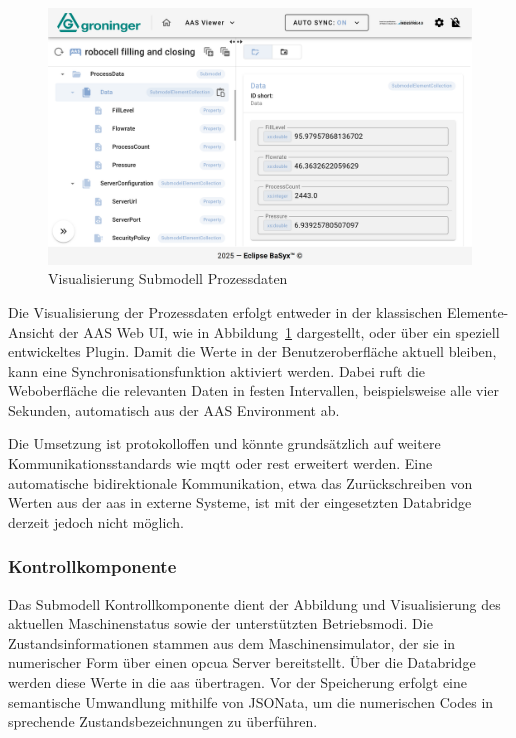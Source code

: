 \vspace{0.2em}
\begin{figure}[htbp]
    \centering
    \includegraphics[width=1\textwidth]{Bilder/ErgebnisseAASWebUI/ProcessData.png}
    \caption{Visualisierung Submodell Prozessdaten}
    \label{fig:Processdata}
\end{figure}
\vspace{-0.7em}
Die Visualisierung der Prozessdaten erfolgt entweder in der klassischen Elemente-Ansicht der AAS Web UI, wie in Abbildung~\ref{fig:Processdata} dargestellt, oder über ein speziell entwickeltes Plugin.
Damit die Werte in der Benutzeroberfläche aktuell bleiben, kann eine Synchronisationsfunktion aktiviert werden.
Dabei ruft die Weboberfläche die relevanten Daten in festen Intervallen, beispielsweise alle vier Sekunden, automatisch aus der AAS Environment ab.

Die Umsetzung ist protokolloffen und könnte grundsätzlich auf weitere Kommunikationsstandards wie \acs{mqtt} oder \acs{rest} erweitert werden.
Eine automatische bidirektionale Kommunikation, etwa das Zurückschreiben von Werten aus der \acs{aas} in externe Systeme, ist mit der eingesetzten Databridge derzeit jedoch nicht möglich.

\subsubsection*{Kontrollkomponente}
\vspace{-0.5em}
Das Submodell Kontrollkomponente dient der Abbildung und Visualisierung des aktuellen Maschinenstatus sowie der unterstützten Betriebsmodi.
Die Zustandsinformationen stammen aus dem Maschinensimulator, der sie in numerischer Form über einen \acs{opcua} Server bereitstellt.
Über die Databridge werden diese Werte in die \acs{aas} übertragen.
Vor der Speicherung erfolgt eine semantische Umwandlung mithilfe von JSONata, um die numerischen Codes in sprechende Zustandsbezeichnungen zu überführen.


